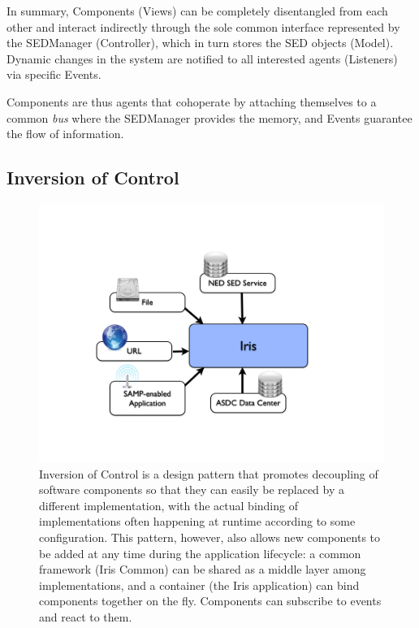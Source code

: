 \documentclass[5p]{elsarticle}
\begin{document}
In summary, Components (Views) can be completely disentangled from each other and interact indirectly through the sole common interface represented by the SEDManager (Controller), which in turn stores the SED objects (Model). Dynamic changes in the system are notified to all interested agents (Listeners) via specific Events.

Components are thus agents that cohoperate by attaching themselves to a common \emph{bus} where the SEDManager provides the memory, and Events guarantee the flow of information.

\subsection{Inversion of Control}

\begin{figure}
\begin{center}
\includegraphics[width=\columnwidth]{figures/IrisDiagrams.002.png}
\caption{Inversion of Control is a design pattern that promotes decoupling of software components so that they can easily be replaced by a different implementation, with the actual binding of implementations often happening at runtime according to some configuration. This pattern, however, also allows new components to be added at any time during the application lifecycle: a common framework (Iris Common) can be shared as a middle layer among implementations, and a container (the Iris application) can bind components together on the fly. Components can subscribe to events and react to them.}
\end{center}
\end{figure}
\end{document}
